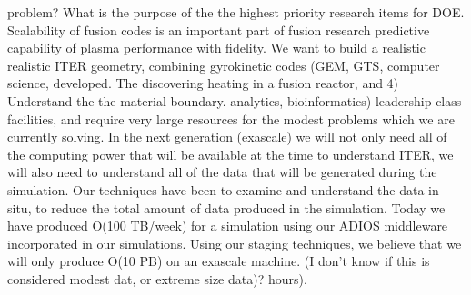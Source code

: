 \documentclass[times]{cpeauth}
\begin{document}
problem? What is the purpose of the %
%
the highest priority research items for DOE. Scalability of %
fusion codes is an important part of fusion research %
predictive capability of plasma performance with %
fidelity. We want to build a realistic %
realistic ITER geometry, combining %
gyrokinetic codes (GEM, GTS, %
computer science, %
developed. The %
discovering %
heating in a fusion reactor, and 4) Understand the %
the material boundary.
%
%
%
analytics, bioinformatics)
%
%
%
leadership class facilities, and require very large resources for the modest
problems which we are currently solving. In the next generation (exascale) we
will not only need all of the computing power that will be available at the time
to understand ITER, we will also need to understand all of the data that will be
generated during the simulation. Our techniques have been to examine and
understand the data in situ, to reduce the total amount of data produced in the
simulation. Today we have produced O(100 TB/week) for a simulation using our
ADIOS middleware incorporated in our simulations. Using our staging techniques,
we believe that we will only produce O(10 PB) on an exascale machine. (I don't
know if this is considered modest dat, or extreme size data)?
%
%
hours).  %
\end{document}
